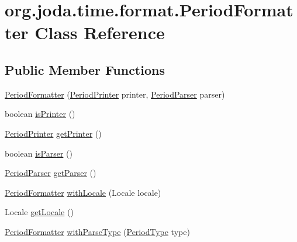 \hypertarget{classorg_1_1joda_1_1time_1_1format_1_1_period_formatter}{\section{org.\-joda.\-time.\-format.\-Period\-Formatter Class Reference}
\label{classorg_1_1joda_1_1time_1_1format_1_1_period_formatter}
}
\subsection*{Public Member Functions}
\begin{DoxyCompactItemize}
\item 
\hyperlink{classorg_1_1joda_1_1time_1_1format_1_1_period_formatter_ae9d08370515856189aace5933b704579}{Period\-Formatter} (\hyperlink{interfaceorg_1_1joda_1_1time_1_1format_1_1_period_printer}{Period\-Printer} printer, \hyperlink{interfaceorg_1_1joda_1_1time_1_1format_1_1_period_parser}{Period\-Parser} parser)
\item 
boolean \hyperlink{classorg_1_1joda_1_1time_1_1format_1_1_period_formatter_a6961b2011920ee9388f5cbbfb2bc822c}{is\-Printer} ()
\item 
\hyperlink{interfaceorg_1_1joda_1_1time_1_1format_1_1_period_printer}{Period\-Printer} \hyperlink{classorg_1_1joda_1_1time_1_1format_1_1_period_formatter_a2c72b3f0d38631c3e4cf2cfed9037ea3}{get\-Printer} ()
\item 
boolean \hyperlink{classorg_1_1joda_1_1time_1_1format_1_1_period_formatter_a70eab0f438011894c9502a4bc0918093}{is\-Parser} ()
\item 
\hyperlink{interfaceorg_1_1joda_1_1time_1_1format_1_1_period_parser}{Period\-Parser} \hyperlink{classorg_1_1joda_1_1time_1_1format_1_1_period_formatter_aa87dba464f34eaf787645cb6850ff418}{get\-Parser} ()
\item 
\hyperlink{classorg_1_1joda_1_1time_1_1format_1_1_period_formatter}{Period\-Formatter} \hyperlink{classorg_1_1joda_1_1time_1_1format_1_1_period_formatter_a179579f429bc0ef9e2c1901e384dc851}{with\-Locale} (Locale locale)
\item 
Locale \hyperlink{classorg_1_1joda_1_1time_1_1format_1_1_period_formatter_adc276bf9a275918d41765e36deb94fe8}{get\-Locale} ()
\item 
\hyperlink{classorg_1_1joda_1_1time_1_1format_1_1_period_formatter}{Period\-Formatter} \hyperlink{classorg_1_1joda_1_1time_1_1format_1_1_period_formatter_a8b8a05164f7310bdc8f95268e4730cdc}{with\-Parse\-Type} (\hyperlink{classorg_1_1joda_1_1time_1_1_period_type}{Period\-Type} type)

\end{DoxyCompactItemize}
